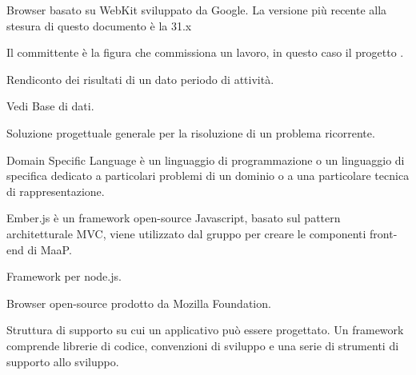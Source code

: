 
Browser basato su WebKit sviluppato da Google. La versione più recente alla stesura di questo documento è la 31.x \\


Il committente è la figura che commissiona un lavoro, in questo caso il progetto \ProjectName. \\


Rendiconto  dei risultati di un dato periodo di attività. \\



Vedi Base di dati. \\





Soluzione progettuale generale per la risoluzione di un problema ricorrente. \\


Domain Specific Language è un linguaggio di programmazione o un linguaggio di specifica dedicato a particolari problemi di un dominio o a una particolare tecnica di rappresentazione. \\



Ember.js è un framework open-source Javascript, basato sul pattern architetturale MVC, viene utilizzato dal gruppo per creare le componenti front-end di MaaP. \\


Framework per node.js. \\



Browser open-source prodotto da Mozilla Foundation. \\


Struttura di supporto su cui un applicativo può essere progettato.
Un framework comprende librerie di codice, convenzioni di sviluppo e una serie di strumenti di supporto allo sviluppo. \\


